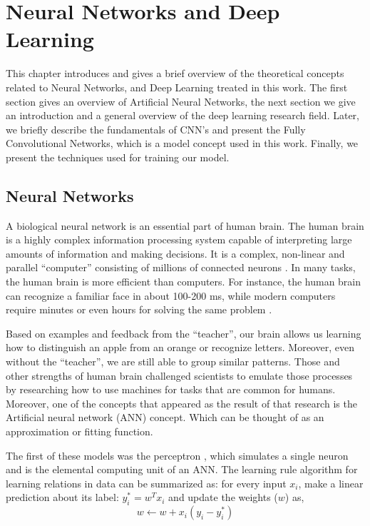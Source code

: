 
\chapter{Neural Networks and Deep Learning} \label{ch:bg}
This chapter introduces and gives a brief overview of the theoretical concepts related to Neural Networks, and Deep Learning treated in this work. The first section gives an overview of Artificial Neural Networks, the next section we give an introduction and a general overview of the deep learning research field. Later, we
briefly describe the fundamentals of CNN's and present the Fully Convolutional Networks, which is a model concept used in this work. Finally, we present the techniques used for training our model.

\section{Neural Networks}

A biological neural network is an essential part of human brain. The human brain is a highly complex information processing system capable of interpreting large amounts of information and making decisions. It is a complex, non-linear and parallel ``computer'' consisting of millions of connected neurons \cite{haykin2009neural}. In many tasks, the human brain is more efficient than computers. For instance, the human brain can recognize a familiar face in about 100-200 ms, while modern computers require minutes or even hours for solving the same problem \cite{haykin2009neural}.

Based on examples and feedback from the ``teacher'', our brain allows us learning how to
distinguish an apple from an orange or recognize letters. Moreover, even without the ``teacher'', we
are still able to group similar patterns. Those and other strengths of human brain
challenged scientists to emulate those processes by researching how to use machines for tasks
that are common for humans. Moreover, one of the concepts that appeared as the result of that
research is the Artificial neural network (ANN) concept. Which can be thought of as an approximation or fitting function.

The first of these models was the perceptron \cite{rosenblatt1958perceptron}, which simulates a single neuron and is the elemental computing unit of an ANN. The learning rule algorithm for learning relations in data can be summarized as: for every input $x_{i}$, make a linear prediction about its label: $y^*_{i} = w^T x_{i}$
and update the weights ($w$) as,
\begin{equation}
w \leftarrow w + x_{i}(y_{i} - y^*_{i})
\end{equation}

